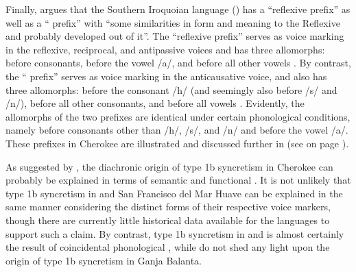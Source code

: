 \newpage

Finally, \cite[343, 347]{montgomery-anderson:2008} argues that the Southern Iroquoian language  () has a “reflexive prefix” as well as a “ prefix” with “some similarities in form and meaning to the Reflexive and probably developed out of it”. The “reflexive prefix” serves as voice marking in the reflexive, reciprocal, and antipassive voices and has three allomorphs:  before consonants,  before the vowel /a/, and  before all other vowels \citep[343]{montgomery-anderson:2008}. By contrast, the “ prefix” serves as voice marking in the anticausative voice, and also has three allomorphs:  before the consonant /h/ (and seemingly also before /s/ and /n/),  before all other consonants, and  before all vowels \citep[372]{montgomery-anderson:2008}. Evidently, the allomorphs of the two prefixes are identical under certain phonological conditions, namely before consonants other than /h/, /s/, and /n/ and before the vowel /a/. These prefixes in Cherokee are illustrated and discussed further in  (see  on page \pageref{tab:ch5:antp-refl-recp-antc-3}). 

As suggested by \citet{montgomery-anderson:2008}, the diachronic origin of type 1b syncretism in Cherokee can probably be explained in terms of semantic and functional . It is not unlikely that type 1b syncretism in  and San Francisco del Mar Huave can be explained in the same manner considering the distinct forms of their respective voice markers, though there are currently little historical data available for the languages to support such a claim. By contrast, type 1b syncretism in  and  is almost certainly the result of coincidental phonological , while \citet{creissels:biaye:2016} do not shed any light upon the origin of type 1b syncretism in Ganja Balanta. 

